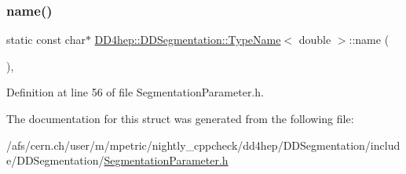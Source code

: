 \subsubsection{\texorpdfstring{name()}{name()}}
{\footnotesize\ttfamily static const char$\ast$ \hyperlink{struct_d_d4hep_1_1_d_d_segmentation_1_1_type_name}{D\+D4hep\+::\+D\+D\+Segmentation\+::\+Type\+Name}$<$ double $>$\+::name (\begin{DoxyParamCaption}{ }\end{DoxyParamCaption})\hspace{0.3cm}{\ttfamily [inline]}, {\ttfamily [static]}}



Definition at line 56 of file Segmentation\+Parameter.\+h.



The documentation for this struct was generated from the following file\+:\begin{DoxyCompactItemize}
\item 
/afs/cern.\+ch/user/m/mpetric/nightly\+\_\+cppcheck/dd4hep/\+D\+D\+Segmentation/include/\+D\+D\+Segmentation/\hyperlink{_segmentation_parameter_8h}{Segmentation\+Parameter.\+h}\end{DoxyCompactItemize}

